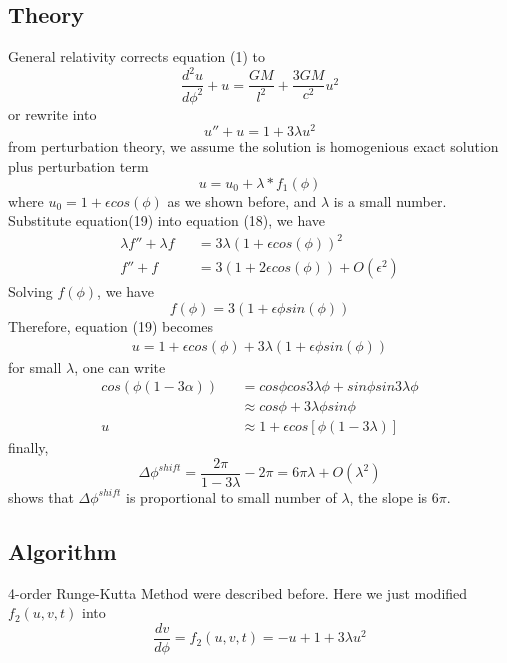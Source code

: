 \documentclass[12pt]{article}
\begin{document}
\subsection{Theory}
General relativity corrects equation (1) to 
\begin{equation}
	\frac{d^2u}{d\phi^2}+u=\frac{GM}{l^2}+\frac{3GM}{c^2}u^2
\end{equation}
or rewrite into
\begin{equation}
	u''+u=1+3\lambda u^2
\end{equation}
from perturbation theory, we assume the solution is homogenious exact solution plus perturbation term
\begin{equation}
	u=u_0+\lambda*f_1(\phi)
\end{equation}
where $u_0=1+\epsilon cos(\phi)$ as we shown before, and $\lambda$ is a small number. Substitute equation(19) into equation (18), we have
\begin{eqnarray}
	\lambda f''+\lambda f &&= 3 \lambda(1+\epsilon cos(\phi))^2\nonumber\\
	f''+f &&=3(1+2\epsilon cos(\phi))+O(\epsilon^2)
\end{eqnarray}
Solving $f(\phi)$, we have
\begin{equation}
	f(\phi)=3(1+\epsilon \phi sin(\phi))
\end{equation}
Therefore, equation (19) becomes
\begin{eqnarray}
	u=1+\epsilon cos(\phi)+3\lambda(1+\epsilon \phi sin(\phi))
\end{eqnarray}
for small $\lambda$, one can write
\begin{eqnarray}
	cos(\phi(1-3\alpha))&&=cos\phi cos3\lambda\phi+sin\phi sin3\lambda\phi\nonumber\\
	&&\approx cos\phi+3\lambda\phi sin\phi\\
	u&&\approx 1+\epsilon cos[\phi(1-3\lambda)]
\end{eqnarray}
finally,
\begin{equation}
	\Delta\phi^{shift}=\frac{2\pi}{1-3\lambda}-2\pi=6\pi\lambda+O(\lambda^2)
\end{equation}
shows that $\Delta\phi^{shift}$ is proportional to small number of $\lambda$, the slope is $6\pi$.

\subsection{Algorithm}
4-order Runge-Kutta Method were described before. Here we just modified $f_2(u,v,t)$ into
\begin{equation}
	\frac{dv}{d\phi}=f_2(u,v,t)=-u+1+3\lambda u^2
\end{equation}
\end{document}
